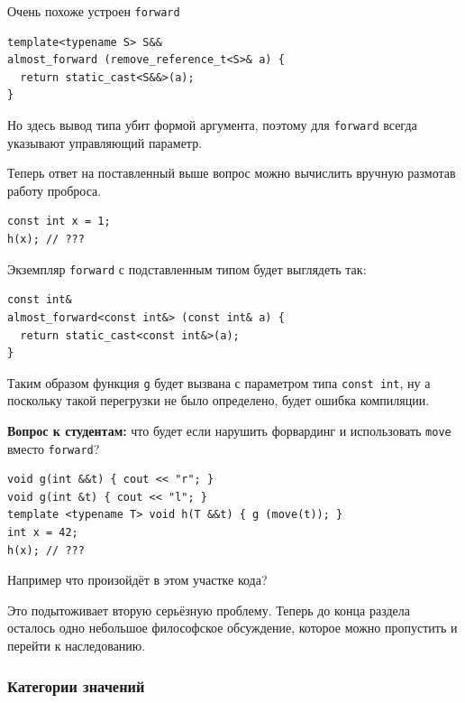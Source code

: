 \documentclass[a4paper,12pt,oneside]{article}
\newif\ifanswers
\begin{document}
Очень похоже устроен \lstinline!forward!

\begin{lstlisting}
template<typename S> S&&
almost_forward (remove_reference_t<S>& a) {
  return static_cast<S&&>(a);
}
\end{lstlisting}

Но здесь вывод типа убит формой аргумента, поэтому для \lstinline!forward! всегда указывают управляющий параметр.

Теперь ответ на поставленный выше вопрос можно вычислить вручную размотав работу проброса.

\begin{lstlisting}
const int x = 1;
h(x); // ???
\end{lstlisting}

Экземпляр \lstinline!forward! с подставленным типом будет выглядеть так:

\begin{lstlisting}
const int&
almost_forward<const int&> (const int& a) {
  return static_cast<const int&>(a);
}
\end{lstlisting}

Таким образом функция \lstinline!g! будет вызвана с параметром типа \lstinline!const int!, ну а поскольку такой перегрузки не было определено, будет ошибка компиляции.

\textbf{Вопрос к студентам:} что будет если нарушить форвардинг и использовать \lstinline!move! вместо \lstinline!forward!?

\begin{lstlisting}
void g(int &&t) { cout << "r"; }
void g(int &t) { cout << "l"; }
template <typename T> void h(T &&t) { g (move(t)); } 
int x = 42;
h(x); // ???
\end{lstlisting}

Например что произойдёт в этом участке кода?

\ifanswers
Правильный ответ: после размотки

\begin{lstlisting}
int&& almost_move<int&>(int& a) {
  using rv_ref_t = int&&;
  return static_cast<rv_ref_t>(a);
} 
\end{lstlisting}

Таким образом будет напечатано ``r''
\fi

Это подытоживает вторую серьёзную проблему. Теперь до конца раздела осталось одно небольшое философское обсуждение, которое можно пропустить и перейти к наследованию.

\subsubsection{Категории значений}
\end{document}
